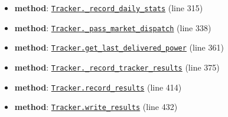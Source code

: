 \documentclass[11pt]{report}
\begin{document}
\begin{itemize}[leftmargin=*]
  \item \textbf{method}: \hyperref[def:tracker.py:Tracker._record_daily_stats:L315]{\texttt{Tracker.\_record\_daily\_stats}} (line 315)
  \item \textbf{method}: \hyperref[def:tracker.py:Tracker._pass_market_dispatch:L338]{\texttt{Tracker.\_pass\_market\_dispatch}} (line 338)
  \item \textbf{method}: \hyperref[def:tracker.py:Tracker.get_last_delivered_power:L361]{\texttt{Tracker.get\_last\_delivered\_power}} (line 361)
  \item \textbf{method}: \hyperref[def:tracker.py:Tracker._record_tracker_results:L375]{\texttt{Tracker.\_record\_tracker\_results}} (line 375)
  \item \textbf{method}: \hyperref[def:tracker.py:Tracker.record_results:L414]{\texttt{Tracker.record\_results}} (line 414)
  \item \textbf{method}: \hyperref[def:tracker.py:Tracker.write_results:L432]{\texttt{Tracker.write\_results}} (line 432)
\end{itemize}
\end{document}
